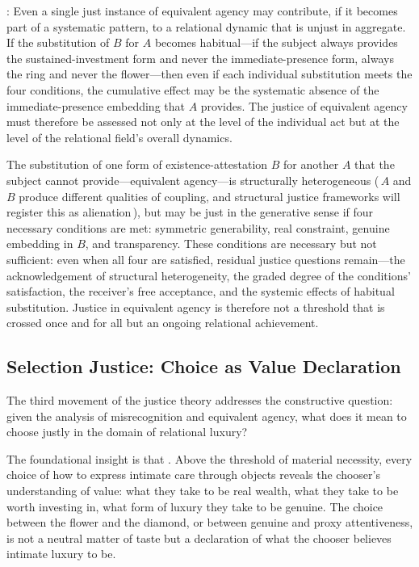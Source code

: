 : Even a single just instance of equivalent agency may contribute, if it becomes part of a systematic pattern, to a relational dynamic that is unjust in aggregate. If the substitution of $B$ for $A$ becomes habitual---if the subject always provides the sustained-investment form and never the immediate-presence form, always the ring and never the flower---then even if each individual substitution meets the four conditions, the cumulative effect may be the systematic absence of the immediate-presence embedding that $A$ provides. The justice of equivalent agency must therefore be assessed not only at the level of the individual act but at the level of the relational field's overall dynamics.

\begin{claim}
The substitution of one form of existence-attestation $B$ for another $A$ that the subject cannot provide---equivalent agency---is structurally heterogeneous (\,$A$ and $B$ produce different qualities of coupling, and structural justice frameworks will register this as alienation\,), but may be just in the generative sense if four necessary conditions are met: symmetric generability, real constraint, genuine embedding in $B$, and transparency. These conditions are necessary but not sufficient: even when all four are satisfied, residual justice questions remain---the acknowledgement of structural heterogeneity, the graded degree of the conditions' satisfaction, the receiver's free acceptance, and the systemic effects of habitual substitution. Justice in equivalent agency is therefore not a threshold that is crossed once and for all but an ongoing relational achievement.
\end{claim}

\subsection{Selection Justice: Choice as Value Declaration}
\label{p16:subsec:selection_justice}

\noindent
The third movement of the justice theory addresses the constructive question: given the analysis of misrecognition and equivalent agency, what does it mean to choose justly in the domain of relational luxury?

The foundational insight is that . Above the threshold of material necessity, every choice of how to express intimate care through objects reveals the chooser's understanding of value: what they take to be real wealth, what they take to be worth investing in, what form of luxury they take to be genuine. The choice between the flower and the diamond, or between genuine and proxy attentiveness, is not a neutral matter of taste but a declaration of what the chooser believes intimate luxury to be.

